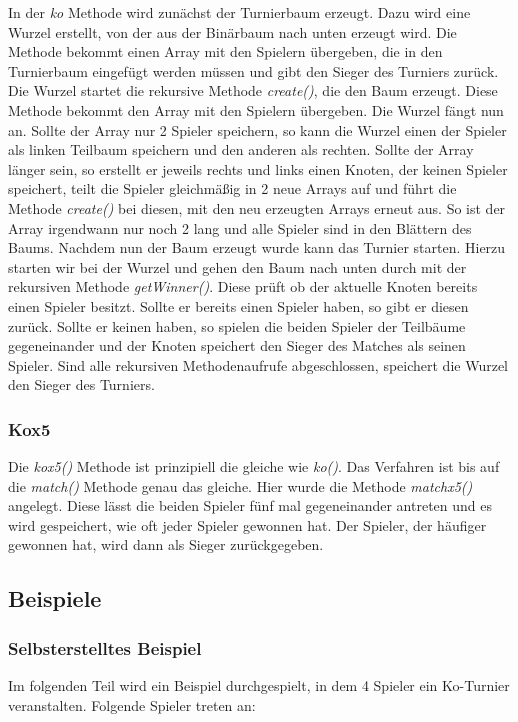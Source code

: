 \documentclass[a4paper, 12pt]{scrartcl}
\begin{document}
In der \emph{ko} Methode wird zunächst der Turnierbaum erzeugt. Dazu wird eine
Wurzel erstellt, von der aus der Binärbaum nach unten erzeugt wird. Die
Methode bekommt einen Array mit den Spielern übergeben, die in den Turnierbaum
eingefügt werden müssen und gibt den Sieger des Turniers zurück. Die Wurzel
startet die rekursive Methode \emph{create()}, die den Baum erzeugt. Diese Methode
bekommt den Array mit den Spielern übergeben. Die Wurzel fängt nun an. Sollte
der Array nur 2 Spieler speichern, so kann die Wurzel einen der Spieler als
linken Teilbaum speichern und den anderen als rechten. Sollte der Array
länger sein, so erstellt er jeweils rechts und links einen Knoten, der keinen
Spieler speichert, teilt die Spieler gleichmäßig in 2 neue Arrays auf und
führt die Methode \emph{create()} bei diesen, mit den neu erzeugten Arrays erneut aus. So ist
der Array irgendwann nur noch 2 lang und alle Spieler sind in den Blättern des
Baums. Nachdem nun der Baum erzeugt wurde kann das Turnier starten. Hierzu
starten wir bei der Wurzel und gehen den Baum nach unten durch mit der
rekursiven Methode \emph{getWinner()}. Diese prüft ob der aktuelle Knoten bereits einen Spieler besitzt. Sollte er bereits einen Spieler haben, so gibt er diesen zurück. Sollte er keinen haben, so spielen die beiden Spieler der Teilbäume gegeneinander und der Knoten
speichert den Sieger des Matches als seinen Spieler. Sind alle rekursiven Methodenaufrufe abgeschlossen, speichert die Wurzel den Sieger des Turniers.


\subsubsection{Kox5}

Die \emph{kox5()} Methode ist prinzipiell die gleiche wie \emph{ko()}. Das Verfahren ist bis auf
die \emph{match()} Methode genau das gleiche. Hier wurde die Methode \emph{matchx5()} angelegt.
Diese lässt die beiden Spieler fünf mal gegeneinander antreten und es wird gespeichert, wie oft jeder Spieler gewonnen hat. Der Spieler, der häufiger
gewonnen hat, wird dann als Sieger zurückgegeben.

\subsection{Beispiele}
\subsubsection{Selbsterstelltes Beispiel}
Im folgenden Teil wird ein Beispiel durchgespielt, in dem 4 Spieler ein Ko-Turnier veranstalten. Folgende Spieler treten an:
\end{document}
